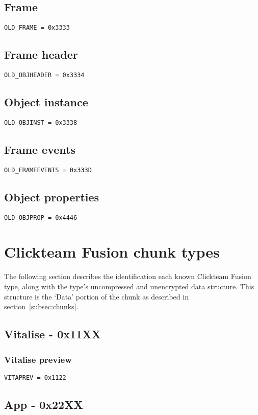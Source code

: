 \documentclass{article}
\begin{document}
\subsection{Frame}
\verb|OLD_FRAME = 0x3333|

\subsection{Frame header}
\verb|OLD_OBJHEADER = 0x3334|

\subsection{Object instance}
\verb|OLD_OBJINST = 0x3338|

\subsection{Frame events}
\verb|OLD_FRAMEEVENTS = 0x333D|

\subsection{Object properties}
\verb|OLD_OBJPROP = 0x4446|


\section[CTF chunks]{Clickteam Fusion chunk types}
\label{sec:ctf-chunks}

The following section describes the identification each known Clickteam Fusion
type, along with the type's uncompressed and unencrypted data structure.
This structure is the `Data' portion of the chunk as described in
section~\ref{subsec:chunks}.

\subsection{Vitalise - 0x11XX}

\subsubsection{Vitalise preview}
\verb|VITAPREV = 0x1122|

\subsection{App - 0x22XX}
\end{document}
